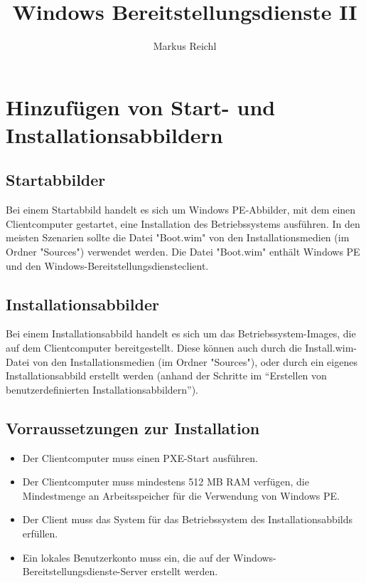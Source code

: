 \documentclass[a4paper,11pt]{article}
\title{Windows Bereitstellungsdienste II}
\author{Markus Reichl}
\begin{document}
\maketitle

\section{Hinzuf\"ugen von Start- und Installationsabbildern}
\subsection{Startabbilder}
Bei einem Startabbild handelt es sich um Windows PE-Abbilder, mit dem einen Clientcomputer gestartet, eine Installation des Betriebssystems ausführen. 
In den meisten Szenarien sollte die Datei "Boot.wim" von den Installationsmedien (im Ordner "Sources") verwendet werden. 
Die Datei "Boot.wim" enthält Windows PE und den Windows-Bereitstellungsdiensteclient.

\subsection{Installationsabbilder}
Bei einem Installationsabbild handelt es sich um das Betriebssystem-Images, die auf dem Clientcomputer bereitgestellt. 
Diese k\"onnen auch durch die Install.wim-Datei von den Installationsmedien (im Ordner "Sources"), oder durch ein eigenes Installationsabbild erstellt werden (anhand der Schritte im ``Erstellen von benutzerdefinierten Installationsabbildern'').

\subsection{Vorraussetzungen zur Installation}
\begin{itemize}
 \item Der Clientcomputer muss einen PXE-Start ausführen.
 \item Der Clientcomputer muss mindestens 512 MB RAM verfügen, die Mindestmenge an Arbeitsspeicher für die Verwendung von Windows PE.
 \item Der Client muss das System für das Betriebssystem des Installationsabbilds erfüllen.
 \item Ein lokales Benutzerkonto muss ein, die auf der Windows-Bereitstellungsdienste-Server erstellt werden.
\end{itemize}
\end{document}
